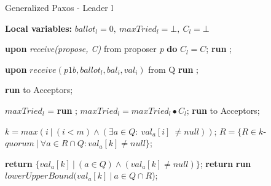 \documentclass[10pt,pdftex,a4paper]{article}%
\begin{document}
\begin{algorithm}
\caption{Generalized Paxos - Leader l}
\textbf{Local variables:} $ballot_l = 0,\ maxTried_l = \bot,\ C_l = \bot$
\begin{algorithmic}[1]
    
    \State \textbf{upon} \textit{receive(propose, C)} from proposer \textit{p} \textbf{do}
        \State \hspace{\algorithmicindent} $C_l = C$;
        \State \hspace{\algorithmicindent} \textbf{run} ;
    
    \State
    \State \textbf{upon} $receive (p1b, ballot_l, bal_i, val_i)$ from Q
        \State \hspace{\algorithmicindent} \textbf{run} ;
        
    \State
        \State \textbf{run}  to Acceptors;
    \EndFunction
    
    \State
        \State $maxTried_l$ = \textbf{run} ;
        \State $maxTried_l = maxTried_l \bullet C_l$;
        \State \textbf{run}  to Acceptors;
    \EndFunction
    
    \State
        \State $k = max(i\ |\ (i < m) \wedge (\exists a \in Q :\ val_a[i]\ \neq null))$;
        \State $R = \{R \in k$-$quorum\ |\ \forall a \in R \cap Q : val_a[k] \neq null\}$;
        
        \State
            \State \textbf{return} $\{val_a[k]\ |\ (a \in Q) \wedge (val_a[k] \neq null)\}$;
        \Else
            \State \textbf{return} \textbf{run} $lowerUpperBound(val_a[k]\ |\ a \in Q \cap R$);
            
        \EndIf
    \EndFunction
        

\end{algorithmic}
\end{algorithm}
\end{document}
